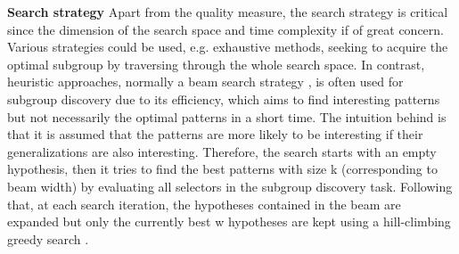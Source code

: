 \textbf{Search strategy}
Apart from the quality measure, the search strategy is critical since the dimension of the search space and time complexity if of great concern. Various strategies could be used, e.g. exhaustive methods, seeking to acquire the optimal subgroup by traversing through the whole search space. In contrast, heuristic approaches, normally a beam search strategy \cite{clark1989cn2}, is often used for subgroup discovery due to its efficiency, which aims to find interesting patterns but not necessarily the optimal patterns in a short time. The intuition behind is that it is assumed that the patterns are more likely to be interesting if their generalizations are also interesting. Therefore, the search starts with an empty hypothesis, then it tries to find the best patterns with size k (corresponding to beam width) by evaluating all selectors in the subgroup discovery task. Following that, at each search iteration, the hypotheses contained in the beam are expanded but only the currently best w hypotheses are kept using a hill-climbing greedy search \cite{atzmueller2015subgroup}. 




